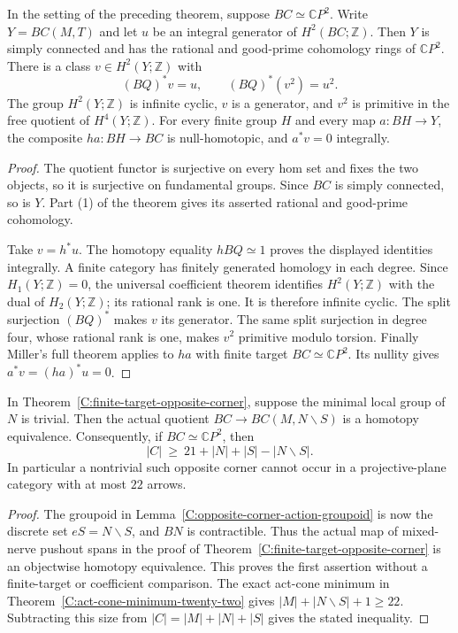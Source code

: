 \begin{corollary}
\label{C:finite-target-corner-CP2}
In the setting of the preceding theorem, suppose $BC\simeq\mathbb CP^2$.
Write $Y=BC(M,T)$ and let $u$ be an integral generator of
$H^2(BC;\mathbb Z)$. Then $Y$ is simply connected and has the
rational and good-prime cohomology rings of $\mathbb CP^2$.
There is a class $v\in H^2(Y;\mathbb Z)$ with
\[
 (BQ)^*v=u,\qquad (BQ)^*(v^2)=u^2.
\]
The group $H^2(Y;\mathbb Z)$ is infinite cyclic, $v$ is a generator,
and $v^2$ is primitive in the free quotient of $H^4(Y;\mathbb Z)$.
For every finite group $H$ and every map $a:BH\to Y$,
the composite $h a:BH\to BC$ is null-homotopic, and
$a^*v=0$ integrally.
\end{corollary}
\begin{proof}
The quotient functor is surjective on every hom set and fixes the
two objects, so it is surjective on fundamental groups. Since
$BC$ is simply connected, so is $Y$.
Part (1) of the theorem gives its asserted rational and
good-prime cohomology.

Take $v=h^*u$. The homotopy equality $hBQ\simeq1$ proves the
displayed identities integrally. A finite category has finitely
generated homology in each degree. Since $H_1(Y;\mathbb Z)=0$,
the universal coefficient theorem identifies $H^2(Y;\mathbb Z)$
with the dual of $H_2(Y;\mathbb Z)$; its rational rank is one.
It is therefore infinite cyclic. The split surjection $(BQ)^*$
makes $v$ its generator. The same split surjection in degree four,
whose rational rank is one, makes $v^2$ primitive modulo torsion.
Finally Miller's full theorem applies to $h a$ with finite target
$BC\simeq\mathbb CP^2$. Its nullity gives
$a^*v=(h a)^*u=0$.
\end{proof}

\begin{corollary}
\label{C:trivial-group-opposite-corner}
In Theorem~\ref{C:finite-target-opposite-corner}, suppose the minimal
local group of $N$ is trivial. Then the actual quotient
$BC\to BC(M,N\backslash S)$ is a homotopy equivalence.
Consequently, if $BC\simeq\mathbb CP^2$, then
\[
 |C|\ \geq\ 21+|N|+|S|-|N\backslash S|.
\]
In particular a nontrivial such opposite corner cannot occur in a
projective-plane category with at most $22$ arrows.
\end{corollary}
\begin{proof}
The groupoid in Lemma~\ref{C:opposite-corner-action-groupoid} is
now the discrete set $eS=N\backslash S$, and $BN$ is contractible.
Thus the actual map of mixed-nerve pushout spans in the proof of
Theorem~\ref{C:finite-target-opposite-corner} is an objectwise
homotopy equivalence. This proves the first assertion without a
finite-target or coefficient comparison.
The exact act-cone minimum in
Theorem~\ref{C:act-cone-minimum-twenty-two} gives
$|M|+|N\backslash S|+1\geq22$. Subtracting this size from
$|C|=|M|+|N|+|S|$ gives the stated inequality.
\end{proof}

